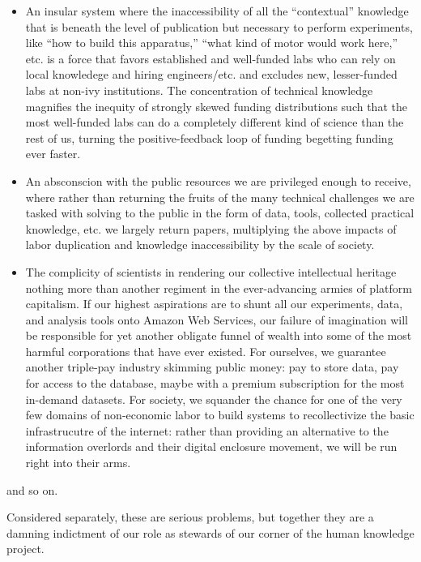 \documentclass[10pt]{article}
\begin{document}
\begin{multicols}{2}
\begin{itemize}

\item
  An insular system where the inaccessibility of all the ``contextual''
  knowledge \cite{woolKnowledgeNetworksHow2020, barleyBackroomsScienceWork1994}  that is beneath the level of
  publication but necessary to perform experiments, like ``how to build
  this apparatus,'' ``what kind of motor would work here,'' etc. is a
  force that favors established and well-funded labs who can rely on
  local knowledege and hiring engineers/etc. and excludes new,
  lesser-funded labs at non-ivy institutions. The concentration of
  technical knowledge magnifies the inequity of strongly skewed funding
  distributions such that the most well-funded labs can do a completely
  different kind of science than the rest of us, turning the
  positive-feedback loop of funding begetting funding ever faster.
\item
  An absconscion with the public resources we are privileged enough to
  receive, where rather than returning the fruits of the many technical
  challenges we are tasked with solving to the public in the form of
  data, tools, collected practical knowledge, etc. we largely return
  papers, multiplying the above impacts of labor duplication and
  knowledge inaccessibility by the scale of society.
\item
  The complicity of scientists in rendering our collective intellectual
  heritage nothing more than another regiment in the ever-advancing
  armies of platform capitalism. If our highest aspirations are to shunt
  all our experiments, data, and analysis tools onto Amazon Web
  Services, our failure of imagination will be responsible for yet
  another obligate funnel of wealth into some of the most harmful
  corporations that have ever existed. For ourselves, we guarantee
  another triple-pay industry skimming public money: pay to store data,
  pay for access to the database, maybe with a premium subscription for
  the most in-demand datasets. For society, we squander the chance for
  one of the very few domains of non-economic labor to build systems to
  recollectivize the basic infrastrucutre of the internet: rather than
  providing an alternative to the information overlords and their
  digital enclosure movement, we will be run right into their arms.
\end{itemize}

and so on.

Considered separately, these are serious problems, but together they are
a damning indictment of our role as stewards of our corner of the human
knowledge project.


\end{multicols}
\end{document}
